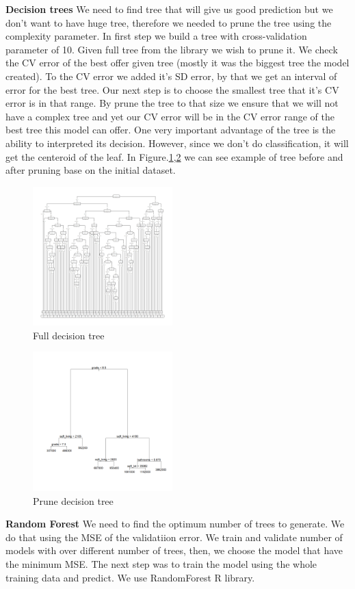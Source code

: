 \textbf{Decision trees} We need to find tree that will give us good prediction but we don't want to have huge tree, therefore we needed to prune the tree using the complexity parameter. In first step we build a tree with cross-validation parameter of 10. Given full tree from the library we wish to prune it. We check the CV error of the best offer given tree (mostly it was the biggest tree the model created). To the CV error we added it's SD error, by that we get an interval of error for the best tree. Our next step is to choose the smallest tree that it's CV error is in that range. By prune the tree to that size we ensure that we will not have a complex tree and yet our CV error will be in the CV error range of the best tree this model can offer. One very important advantage of the tree is the ability to interpreted its decision. However,  since we don't do classification, it will get the centeroid of the leaf. In Figure.\ref{fig:dt},\ref{fig:dtp} we can see example of tree before and after pruning base on the initial dataset.

\begin{multicols}{2}
\begin{figure}[H]
\centering
\includegraphics[width=0.48\textwidth]{img/trainingdt.png}
\caption{Full decision tree}
\label{fig:dt}
\end{figure}
\begin{figure}[H]
\centering
\includegraphics[width=0.48\textwidth]{img/regression_treelib_tree_training.png}
\caption{Prune decision tree}
\label{fig:dtp}
\end{figure}
\end{multicols}


\textbf{Random Forest} We need to find the optimum number of trees to generate. We do that using the MSE of the validatiion error. We train and validate number of models with over  different number of trees, then, we choose the model that have the minimum MSE. The next step was to train the model using the whole training data and predict. We use RandomForest R library.

